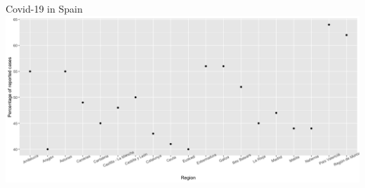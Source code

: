 \documentclass[aspectratio=169,usepdftitle=true]{beamer}
\begin{document}
\begin{frame}[fragile]{Covid-19 in Spain}
\centering
\hspace{-1.6cm}
\includegraphics[scale=0.3]{perc_reported.png}
\end{frame}
\end{document}
